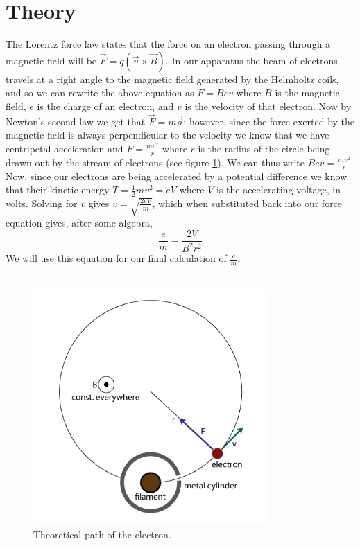 \documentclass[aps,twocolumn,secnumarabic,amsmath,amssymb,nofootinbib]{revtex4-1}
\begin{document}
\section{Theory}

The Lorentz force law states that the force on an electron passing through a magnetic field will be $\vec{F} = q(\vec{v} \times \vec{B})$. In our apparatus the beam of electrons travels at a right angle to the magnetic field generated by the Helmholtz coils, and so we can rewrite the above equation as $F = Bev$ where $B$ is the magnetic field, $e$ is the charge of an electron, and $v$ is the velocity of that electron. Now by Newton's second law we get that $\vec{F} = m\vec{a}$; however, since the force exerted by the magnetic field is always perpendicular to the velocity we know that we have centripetal acceleration and $F = \frac{mv^2}{r}$ where $r$ is the radius of the circle being drawn out by the stream of electrons (see figure \ref{fig:theory}). We can thus write $Bev = \frac{mv^2}{r}$. Now, since our electrons are being accelerated by a potential difference we know that their kinetic energy $T = \frac{1}{2}mv^2 = eV$ where $V$ is the accelerating voltage, in volts. Solving for $v$ gives $v = \sqrt{\frac{2eV}{m}}$, which when substituted back into our force equation gives, after some algebra, 
\begin{equation}
	\frac{e}{m} = \frac{2V}{B^2r^2}
	\label{eq:e_over_m}
\end{equation}
We will use this equation for our final calculation of $\frac{e}{m}$. 
\\\\

\begin{figure}[ht]
\includegraphics[width=9cm, keepaspectratio]{../images/e_over_m_theory.png}
\caption{Theoretical path of the electron.}
\label{fig:theory}
\end{figure}
\end{document}

